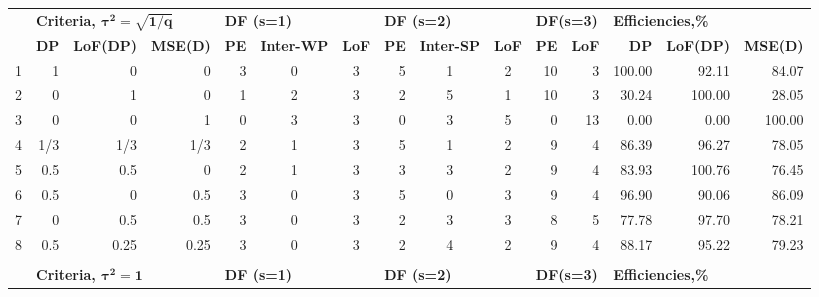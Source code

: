 \begin{table}[h]
{\begin{tabular}{rrrrccccccrrrrr}
  & \multicolumn{3}{l}{\textbf{Criteria, $\bm{\tau^2=\sqrt{1/q}}$}}    & \multicolumn{3}{l}{\textbf{DF (s=1)}}   & \multicolumn{3}{l}{\textbf{DF (s=2)}}    & \multicolumn{2}{l}{\textbf{DF(s=3)}} & \multicolumn{3}{l}{\textbf{Efficiencies,\%}}     \\
  & \textbf{DP} & \textbf{LoF(DP)} & \textbf{MSE(D)} & \textbf{PE} & \textbf{Inter-WP} & \textbf{LoF} & \textbf{PE} & \textbf{Inter-SP} & \textbf{LoF}& \textbf{PE}      & \textbf{LoF}      & \textbf{DP} & \textbf{LoF(DP)} & \textbf{MSE(D)} \\
1 & 1    & 0    & 0    & \multicolumn{1}{|r}{3} & 0 & 3 & \multicolumn{1}{|r}{5} & 1 & 2 & \multicolumn{1}{|r}{10} & 3  & \multicolumn{1}{|r}{100.00} & 92.11  & 84.07  \\
2 & 0    & 1    & 0    & \multicolumn{1}{|r}{1} & 2 & 3 & \multicolumn{1}{|r}{2} & 5 & 1 & \multicolumn{1}{|r}{10} & 3  & \multicolumn{1}{|r}{30.24}  & 100.00 & 28.05  \\
3 & 0    & 0    & 1    & \multicolumn{1}{|r}{0} & 3 & 3 & \multicolumn{1}{|r}{0} & 3 & 5 & \multicolumn{1}{|r}{0}  & 13 & \multicolumn{1}{|r}{0.00}   & 0.00   & 100.00 \\
4 &1/3  & 1/3  & 1/3   & \multicolumn{1}{|r}{2} & 1 & 3 & \multicolumn{1}{|r}{5} & 1 & 2 & \multicolumn{1}{|r}{9}  & 4  & \multicolumn{1}{|r}{86.39}  & 96.27  & 78.05  \\
5 & 0.5  & 0.5  & 0    & \multicolumn{1}{|r}{2} & 1 & 3 & \multicolumn{1}{|r}{3} & 3 & 2 & \multicolumn{1}{|r}{9}  & 4  & \multicolumn{1}{|r}{83.93}  & 100.76 & 76.45  \\
6 & 0.5  & 0    & 0.5  & \multicolumn{1}{|r}{3} & 0 & 3 & \multicolumn{1}{|r}{5} & 0 & 3 & \multicolumn{1}{|r}{9}  & 4  & \multicolumn{1}{|r}{96.90}  & 90.06  & 86.09  \\
7 & 0    & 0.5  & 0.5  & \multicolumn{1}{|r}{3} & 0 & 3 & \multicolumn{1}{|r}{2} & 3 & 3 & \multicolumn{1}{|r}{8}  & 5  & \multicolumn{1}{|r}{77.78}  & 97.70  & 78.21  \\
8 & 0.5  & 0.25 & 0.25 & \multicolumn{1}{|r}{3} & 0 & 3 & \multicolumn{1}{|r}{2} & 4 & 2 & \multicolumn{1}{|r}{9}  & 4  & \multicolumn{1}{|r}{88.17}  & 95.22  & 79.23  \\
  &      &      &      &   &   &   &   &   &   &    &    &        &        &        \\  
  & \multicolumn{3}{l}{\textbf{Criteria, $\bm{\tau^2=1}$}}    & \multicolumn{3}{l}{\textbf{DF (s=1)}}   & \multicolumn{3}{l}{\textbf{DF (s=2)}}    & \multicolumn{2}{l}{\textbf{DF(s=3)}} & \multicolumn{3}{l}{\textbf{Efficiencies,\%}}     \\

\end{tabular}}
\end{table}
